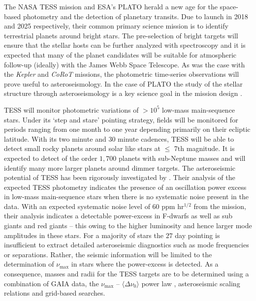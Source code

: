 The NASA TESS mission \citep{2015JATIS...1a4003R} and ESA's PLATO \citep{2014ExA....38..249R} herald a new age for the space-based photometry and the detection of planetary transits. Due to launch in 2018 and 2025 respectively, their common primary science mission is to identify terrestrial planets around bright stars. The pre-selection of bright targets will ensure that the stellar hosts can be further analyzed with spectroscopy and it is expected that many of the planet candidates will be suitable for atmospheric follow-up (ideally) with the James Webb Space Telescope. As was the case with the \emph{Kepler} and \emph{CoRoT} missions, the photometric time-series observations will prove useful to asteroseismology. In the case of PLATO the study of the stellar structure through asteroseismology is a key science goal in the mission design \citep{2014ExA....38..249R}.  

TESS will monitor photometric variations of ${> 10^5}$ low-mass main-sequence stars. Under its `step and stare' pointing strategy, fields will be monitored for periods ranging from one month to one year depending primarily on their ecliptic latitude. With its two minute and $30$ minute cadences, TESS will be able to detect small rocky planets around solar like stars at $\le$ 7th magnitude. It is expected to detect of the order $1,700$ planets with sub-Neptune masses \citep{2016ApJ...830..138C} and will identify many more larger planets around dimmer targets.  The asteroseismic potential of TESS has been rigorously investigated by \citet{2016ApJ...830..138C}. Their analysis of the expected TESS photometry indicates the presence of an oscillation power excess 
in low-mass main-sequence stars when there is no systematic noise present in the data. With an expected systematic noise level of  $60$ ppm hr$^{1/2}$ from the mission, their analysis indicates a detectable power-excess in F-dwarfs as well as sub giants and red giants -- this owing to the higher luminosity and hence larger mode amplitudes in these stars. For a majority of stars the $27$ day pointing is insufficient to extract detailed asteroseismic diagnostics such as mode frequencies or separations. Rather, the seismic information will be limited to the determination of $\nu_{\max}$ in stars where the power-excess is detected. As a consequence, masses and radii for the TESS targets are to be determined using a combination of  GAIA data, the  $\nu_{\max}$ -- ${\langle\Delta\nu_0\rangle}$ power law \citep{2009A&A...506..465H,2009MNRAS.400L..80S} , asteroseismic scaling relations and grid-based searches.  
 

